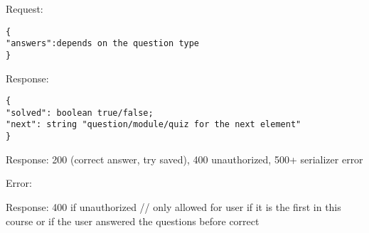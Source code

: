 Request:

\begin{verbatim}
{
"answers":depends on the question type 
}
\end{verbatim}

Response:

\begin{verbatim}
{
"solved": boolean true/false;
"next": string "question/module/quiz for the next element"
}
\end{verbatim}

Response: 200 (correct answer, try saved), 400 unauthorized, 500+
serializer error

Error:

Response: 400 if unauthorized // only allowed for user if it is the
first in this course or if the user answered the questions before
correct
